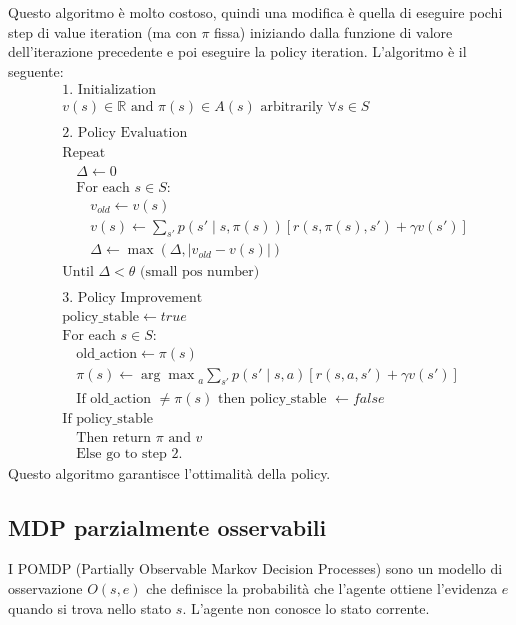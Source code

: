 \documentclass[a4paper]{article}
\begin{document}
\vspace{1em}
\noindent
Questo algoritmo è molto costoso, quindi una modifica è quella di eseguire pochi step
di value iteration (ma con \( \pi  \) fissa) iniziando dalla funzione di valore
dell'iterazione precedente e poi eseguire la policy iteration. L'algoritmo è il
seguente:
\[
\begin{aligned}
  &\text{1. Initialization}\\
  &v(s) \in \mathbb{R} \text{ and } \pi(s) \in A(s) \text{ arbitrarily } \forall s \in S\\
  \\
  &\text{2. Policy Evaluation}\\
  &\text{Repeat}\\
  &\quad \Delta \leftarrow 0\\
  &\quad \text{For each } s \in S:\\
  &\quad \quad v_{old} \leftarrow v(s)\\
  &\quad \quad v(s) \leftarrow \sum_{s'} p(s' \;|\; s, \pi(s)) \left[ r(s, \pi(s), s') + \gamma v(s') \right]\\
  &\quad \quad \Delta \leftarrow \max(\Delta, |v_{old} - v(s)|)\\
  &\text{Until } \Delta < \theta \text{ (small pos number)}\\
  \\
  &\text{3. Policy Improvement}\\
  &\text{policy\_stable} \leftarrow true\\
  &\text{For each } s \in S:\\
  &\quad \text{old\_action} \leftarrow \pi(s)\\
  &\quad \pi(s) \leftarrow {\arg\max}_a \sum_{s'} p(s' \;|\; s, a) \left[ r(s, a, s') + \gamma v(s') \right]\\
  &\quad \text{If old\_action } \ne \pi(s) \text{ then policy\_stable } \leftarrow false\\
  &\text{If policy\_stable}\\
  &\quad \text{Then return } \pi \text{ and } v\\
  &\quad \text{Else go to step 2.}
\end{aligned}
\] 
Questo algoritmo garantisce l'ottimalità della policy.

\subsection{MDP parzialmente osservabili}
I POMDP (Partially Observable Markov Decision Processes) sono un modello di osservazione
\( O(s, e) \) che definisce la probabilità che l'agente ottiene l'evidenza \( e \) quando
si trova nello stato \( s \). L'agente non conosce lo stato corrente.
\end{document}
